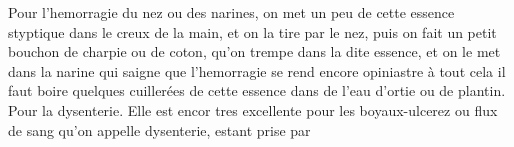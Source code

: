 \pend%
\pstart%
Pour l'hemorragie du nez ou des narines, on met un peu de cette essence styptique dans le creux de la main, et on la tire par le nez, puis on fait un petit bouchon de charpie ou de coton, qu'on trempe dans la dite essence, et on le met dans la narine qui saigne que  l'hemorragie se rend encore opiniastre \`{a} tout cela il faut boire quelques cuiller\'{e}es de cette essence dans de l'eau d'ortie ou de plantin. 
\pend%
\pstart%
Pour la dysenterie. Elle est encor tres excellente pour les boyaux-ulcerez ou flux de sang qu'on appelle dysenterie, estant prise par%
